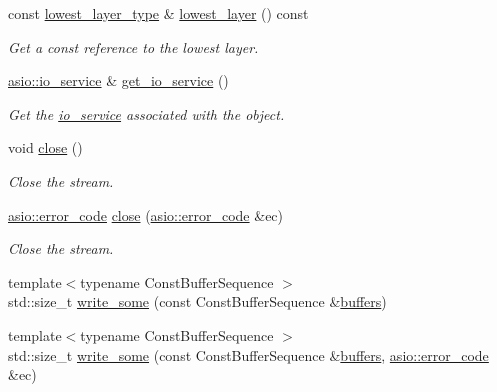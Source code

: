\begin{DoxyCompactItemize}
const \hyperlink{classasio_1_1buffered__read__stream_a041a7cecfeb013857bd1839dcd43de49}{lowest\+\_\+layer\+\_\+type} \& \hyperlink{classasio_1_1buffered__read__stream_ace66b13c950ee2db7ec9c6296a1ebdb6}{lowest\+\_\+layer} () const 
\begin{DoxyCompactList}\small\item\em Get a const reference to the lowest layer. \end{DoxyCompactList}\item 
\hyperlink{classasio_1_1io__service}{asio\+::io\+\_\+service} \& \hyperlink{classasio_1_1buffered__read__stream_a7152e8e8a32ea3e453aa50869e2fd2ce}{get\+\_\+io\+\_\+service} ()
\begin{DoxyCompactList}\small\item\em Get the \hyperlink{classasio_1_1io__service}{io\+\_\+service} associated with the object. \end{DoxyCompactList}\item 
void \hyperlink{classasio_1_1buffered__read__stream_a599f1e4009bf1cad9cca7c4fd8175ade}{close} ()
\begin{DoxyCompactList}\small\item\em Close the stream. \end{DoxyCompactList}\item 
\hyperlink{classasio_1_1error__code}{asio\+::error\+\_\+code} \hyperlink{classasio_1_1buffered__read__stream_a9fab806dfa92a856dd8482e90ab6469b}{close} (\hyperlink{classasio_1_1error__code}{asio\+::error\+\_\+code} \&ec)
\begin{DoxyCompactList}\small\item\em Close the stream. \end{DoxyCompactList}\item 
{\footnotesize template$<$typename Const\+Buffer\+Sequence $>$ }\\std\+::size\+\_\+t \hyperlink{classasio_1_1buffered__read__stream_a97b2eefafe67150b400e278a1dc9eb9f}{write\+\_\+some} (const Const\+Buffer\+Sequence \&\hyperlink{group__async__read_ga54dede45c3175148a77fe6635222c47d}{buffers})
\item 
{\footnotesize template$<$typename Const\+Buffer\+Sequence $>$ }\\std\+::size\+\_\+t \hyperlink{classasio_1_1buffered__read__stream_a4e7dd5f09ea26114cb34652de5b23ce4}{write\+\_\+some} (const Const\+Buffer\+Sequence \&\hyperlink{group__async__read_ga54dede45c3175148a77fe6635222c47d}{buffers}, \hyperlink{classasio_1_1error__code}{asio\+::error\+\_\+code} \&ec)
\item 

\end{DoxyCompactItemize}
